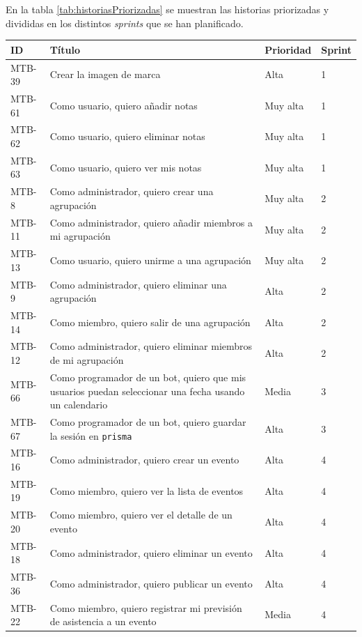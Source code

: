 En la tabla \ref{tab:historiasPriorizadas} se muestran las historias priorizadas y divididas en los distintos \textit{sprints} que se han planificado.


\begin{longtable}{| p{} | p{} | p{} | p{} |}
\hline
ID & Título & Prioridad & Sprint \\ \hline
MTB-39 & Crear la imagen de marca & Alta & 1 \\ \hline
MTB-61 & Como usuario, quiero añadir notas & Muy alta & 1 \\ \hline
MTB-62 & Como usuario, quiero eliminar notas & Muy alta & 1 \\ \hline
MTB-63 & Como usuario, quiero ver mis notas & Muy alta & 1 \\ \hline
MTB-8 & Como administrador, quiero crear una agrupación & Muy alta & 2 \\ \hline
MTB-11 & Como administrador, quiero añadir miembros a mi agrupación & Muy alta & 2 \\ \hline
MTB-13 & Como usuario, quiero unirme a una agrupación & Muy alta & 2 \\ \hline
MTB-9 & Como administrador, quiero eliminar una agrupación & Alta & 2 \\ \hline
MTB-14 & Como miembro, quiero salir de una agrupación & Alta & 2 \\ \hline
MTB-12 & Como administrador, quiero eliminar miembros de mi agrupación & Alta & 2 \\ \hline
MTB-66 & Como programador de un bot, quiero que mis usuarios puedan seleccionar una fecha usando un calendario & Media & 3 \\ \hline
MTB-67 & Como programador de un bot, quiero guardar la sesión en \texttt{prisma} & Alta & 3 \\ \hline
MTB-16 & Como administrador, quiero crear un evento & Alta & 4 \\ \hline
MTB-19 & Como miembro, quiero ver la lista de eventos & Alta & 4 \\ \hline
MTB-20 & Como miembro, quiero ver el detalle de un evento & Alta & 4 \\ \hline
MTB-18 & Como administrador, quiero eliminar un evento & Alta & 4 \\ \hline
MTB-36 & Como administrador, quiero publicar un evento & Alta & 4 \\ \hline
MTB-22 & Como miembro, quiero registrar mi previsión de asistencia a un evento & Media & 4 \\ \hline

\end{longtable}
